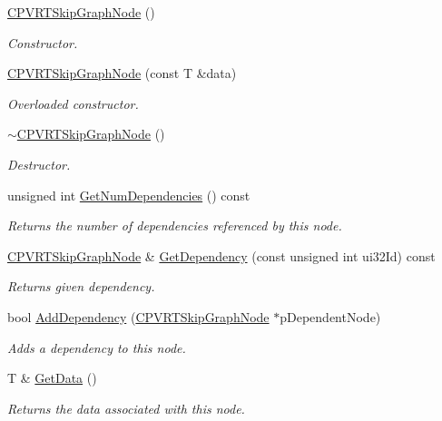 \begin{DoxyCompactItemize}
\item 
\hyperlink{class_c_p_v_r_t_skip_graph_node_a6934bb7b07c96e822c0ca8159dfdc35a}{C\+P\+V\+R\+T\+Skip\+Graph\+Node} ()
\begin{DoxyCompactList}\small\item\em Constructor. \end{DoxyCompactList}\item 
\hyperlink{class_c_p_v_r_t_skip_graph_node_a951f2adde63f4a04fdf45c634d3da385}{C\+P\+V\+R\+T\+Skip\+Graph\+Node} (const T \&data)
\begin{DoxyCompactList}\small\item\em Overloaded constructor. \end{DoxyCompactList}\item 
\hyperlink{class_c_p_v_r_t_skip_graph_node_a1d4c23c3299067ed5d7d1000ddb40343}{$\sim$\+C\+P\+V\+R\+T\+Skip\+Graph\+Node} ()
\begin{DoxyCompactList}\small\item\em Destructor. \end{DoxyCompactList}\item 
unsigned int \hyperlink{class_c_p_v_r_t_skip_graph_node_a35b353dbf3e4cef1690015b0a72fd395}{Get\+Num\+Dependencies} () const 
\begin{DoxyCompactList}\small\item\em Returns the number of dependencies referenced by this node. \end{DoxyCompactList}\item 
\hyperlink{class_c_p_v_r_t_skip_graph_node}{C\+P\+V\+R\+T\+Skip\+Graph\+Node} \& \hyperlink{class_c_p_v_r_t_skip_graph_node_a130d821e7a71fff99757c9771d508d96}{Get\+Dependency} (const unsigned int ui32\+Id) const 
\begin{DoxyCompactList}\small\item\em Returns given dependency. \end{DoxyCompactList}\item 
bool \hyperlink{class_c_p_v_r_t_skip_graph_node_a5efdde71eba54716499493d5236cf539}{Add\+Dependency} (\hyperlink{class_c_p_v_r_t_skip_graph_node}{C\+P\+V\+R\+T\+Skip\+Graph\+Node} $\ast$p\+Dependent\+Node)
\begin{DoxyCompactList}\small\item\em Adds a dependency to this node. \end{DoxyCompactList}\item 
T \& \hyperlink{class_c_p_v_r_t_skip_graph_node_a64fef0c7992d88ef17806531f1b3461a}{Get\+Data} ()
\begin{DoxyCompactList}\small\item\em Returns the data associated with this node. \end{DoxyCompactList}\end{DoxyCompactItemize}


